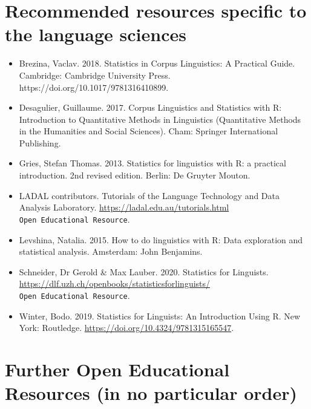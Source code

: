 \documentclass[
  letterpaper,
  DIV=11,
  numbers=noendperiod,
  oneside]{scrreprt}
\begin{document}
\section{Recommended resources specific to the language
sciences}\label{recommended-resources-specific-to-the-language-sciences}

\begin{itemize}
\item
  Brezina, Vaclav. 2018. Statistics in Corpus Linguistics: A Practical
  Guide. Cambridge: Cambridge University Press.
  https://doi.org/10.1017/9781316410899.
\item
  Desagulier, Guillaume. 2017. Corpus Linguistics and Statistics with R:
  Introduction to Quantitative Methods in Linguistics (Quantitative
  Methods in the Humanities and Social Sciences). Cham: Springer
  International Publishing.
\item
  Gries, Stefan Thomas. 2013. Statistics for linguistics with R: a
  practical introduction. 2nd revised edition. Berlin: De Gruyter
  Mouton.
\item
  LADAL contributors. Tutorials of the Language Technology and Data
  Analysis Laboratory. \url{https://ladal.edu.au/tutorials.html}
  \texttt{Open\ Educational\ Resource}.
\item
  Levshina, Natalia. 2015. How to do linguistics with R: Data
  exploration and statistical analysis. Amsterdam: John Benjamins.
\item
  Schneider, Dr Gerold \& Max Lauber. 2020. Statistics for Linguists.
  \url{https://dlf.uzh.ch/openbooks/statisticsforlinguists/}
  \texttt{Open\ Educational\ Resource}.
\item
  Winter, Bodo. 2019. Statistics for Linguists: An Introduction Using R.
  New York: Routledge.
  \href{https://doi.org/10.1017/9781316410899}{https://doi.org/10.4324/9781315165547}.
\end{itemize}

\section{Further Open Educational Resources (in no particular
order)}\label{further-open-educational-resources-in-no-particular-order}
\end{document}
